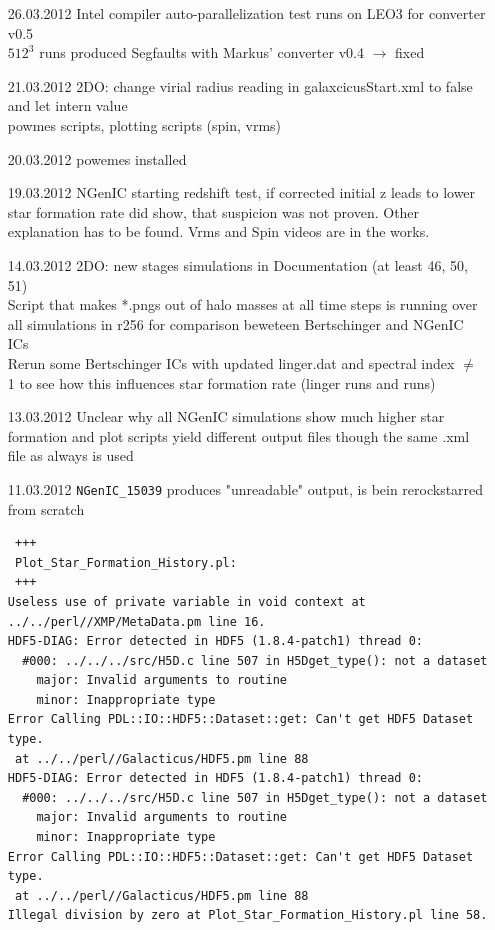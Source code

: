 \begin{itemize}
\item[26.03.2012] 
Intel compiler auto-parallelization test runs on LEO3 
for converter v0.5 \\
$512^3$ runs produced Segfaults with Markus' converter 
v0.4 $\rightarrow$ fixed \\

\item[21.03.2012]
2DO: change virial radius reading in galaxcicusStart.xml 
to false and let intern value \\
powmes scripts, plotting scripts (spin, vrms) \\

\item[20.03.2012]
powemes installed 

\item[19.03.2012]
NGenIC starting redshift test, if corrected initial z leads to 
lower star formation rate did show, that suspicion was not 
proven. Other explanation has to be found. Vrms and Spin videos are 
in the works. 

\item[14.03.2012]
2DO: new stages simulations in Documentation 
(at least 46, 50, 51) \\
Script that makes *.pngs out of halo masses at all 
time steps is running over all simulations in r256  for 
comparison beweteen Bertschinger and NGenIC ICs \\
Rerun some Bertschinger ICs with updated linger.dat and 
spectral index $\neq$ 1 to see how this influences 
star formation rate (linger runs and runs) \\


\item[13.03.2012]
Unclear why all NGenIC simulations show much higher 
star formation and plot scripts yield different 
output files though the same .xml file as always 
is used 

\item[11.03.2012]
\texttt{NGenIC\_15039} produces "unreadable" output, 
is bein rerockstarred from scratch 
\begin{verbatim}
 +++ 
 Plot_Star_Formation_History.pl:
 +++ 
Useless use of private variable in void context at ../../perl//XMP/MetaData.pm line 16.
HDF5-DIAG: Error detected in HDF5 (1.8.4-patch1) thread 0:
  #000: ../../../src/H5D.c line 507 in H5Dget_type(): not a dataset
    major: Invalid arguments to routine
    minor: Inappropriate type
Error Calling PDL::IO::HDF5::Dataset::get: Can't get HDF5 Dataset type.
 at ../../perl//Galacticus/HDF5.pm line 88
HDF5-DIAG: Error detected in HDF5 (1.8.4-patch1) thread 0:
  #000: ../../../src/H5D.c line 507 in H5Dget_type(): not a dataset
    major: Invalid arguments to routine
    minor: Inappropriate type
Error Calling PDL::IO::HDF5::Dataset::get: Can't get HDF5 Dataset type.
 at ../../perl//Galacticus/HDF5.pm line 88
Illegal division by zero at Plot_Star_Formation_History.pl line 58.
\end{verbatim}


\end{itemize}
